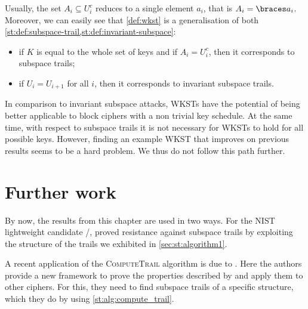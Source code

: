 Usually, the set $A_i \subseteq U_i^c$ reduces to a single element $a_i$, that is $A_i = \set{a_i}$.
Moreover, we can easily see that \cref{def:wkst} is a generalisation of both \cref{st:def:subspace-trail,st:def:invariant-subspace}:
\begin{itemize}
\item if $K$ is equal to the whole set of keys and if $A_i = U_i^c$, then it corresponds to subspace trails;
\item if $U_i = U_{i+1}$ for all $i$, then it corresponds to invariant subspace trails.
\end{itemize}

In comparison to invariant subspace attacks, WKSTs have the potential of being better applicable to block ciphers with a non trivial key schedule.
At the same time, with respect to subspace trails it is not necessary for WKSTs to hold for all possible keys.
However, finding an example WKST that improves on previous results seems to be a hard problem.
We thus do not follow this path further.

\section{Further work}
By now, the results from this chapter are used in two ways.
For the NIST lightweight candidate \saturnin/, \textcite{LWC:Saturnin} proved resistance against subspace trails by exploiting the structure of the trails we exhibited in \cref{sec:st:algorithm1}.

A recent application of the \textsc{ComputeTrail} algorithm is due to \textcite{ToSC:BouCanCog19}.
Here the authors provide a new framework to prove the properties described by \textcite{ToSC:GraRecRon16,EC:GraRecRon17} and apply them to other ciphers.
For this, they need to find subspace trails of a specific structure, which they do by using \cref{st:alg:compute_trail}.
